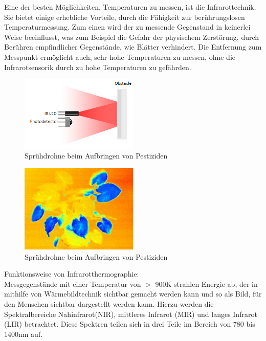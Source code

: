 Eine der besten Möglichkeiten, Temperaturen zu messen, ist die Infrarottechnik.
Sie bietet einige erhebliche Vorteile, durch die Fähigkeit zur berührungslosen
Temperaturmessung. Zum einen wird der zu messende Gegenstand in keinerlei Weise
beeinflusst, was zum Beispiel die Gefahr der physischem Zerstörung, durch
Berühren empfindlicher Gegenstände, wie Blätter verhindert. Die
Entfernung zum Messpunkt ermöglicht auch, sehr hohe Temperaturen zu messen,
ohne die Infrarotsensorik durch zu hohe Temperaturen zu gefährden.

\begin{figure}[ht]
	\centering
	\includegraphics[width=0.5\textwidth]{bilder/infrarotsensor.png}
	\caption[Sprühdrohne]{Sprühdrohne beim Aufbringen von Pestiziden}
	\label{fig:sprühdrohne}
\end{figure}

\begin{figure}[!h]
	\centering
	\includegraphics[width=0.5\textwidth]{bilder/infrarot_pflanze.jpg}
	\caption[Sprühdrohne]{Sprühdrohne beim Aufbringen von Pestiziden}
	\label{fig:sprühdrohne}
\end{figure}

Funktionsweise von Infrarotthermographie: \\
Messgegenstände mit einer Temperatur von $>$ 900K strahlen Energie ab, der in mithilfe von Wärmebildtechnik sichtbar gemacht werden kann und so als Bild, für den Menschen sichtbar dargestellt werden kann.
Hierzu werden die Spektralbereiche Nahinfrarot(NIR), mittleres Infrarot (MIR) und langes Infrarot (LIR) betrachtet. 
Diese Spektren teilen sich in drei Teile im Bereich von 780 bis 1400nm auf.\cite{schuster2004infrarotthermographie}
